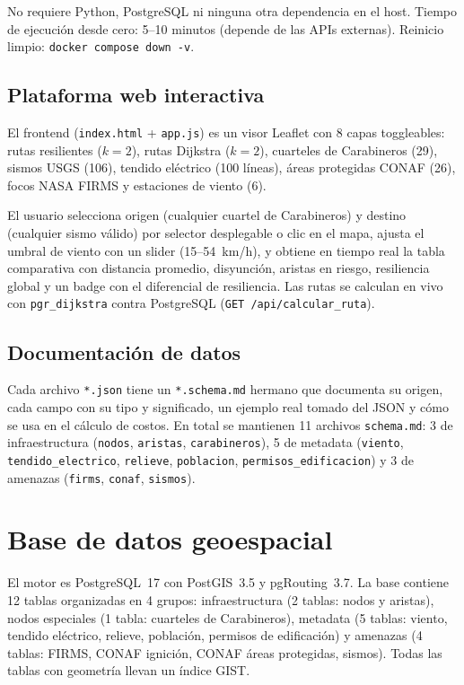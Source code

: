 \documentclass[conference]{IEEEtran}
\begin{document}
No requiere Python, PostgreSQL ni ninguna otra dependencia en el host. Tiempo de ejecución desde cero: 5--10 minutos (depende de las APIs externas). Reinicio limpio: \texttt{docker compose down -v}.

\subsection{Plataforma web interactiva}

El frontend (\texttt{index.html} + \texttt{app.js}) es un visor Leaflet con 8 capas toggleables: rutas resilientes ($k=2$), rutas Dijkstra ($k=2$), cuarteles de Carabineros (29), sismos USGS (106), tendido eléctrico (100 líneas), áreas protegidas CONAF (26), focos NASA FIRMS y estaciones de viento (6).

El usuario selecciona origen (cualquier cuartel de Carabineros) y destino (cualquier sismo válido) por selector desplegable o clic en el mapa, ajusta el umbral de viento con un slider (15--54~km/h), y obtiene en tiempo real la tabla comparativa con distancia promedio, disyunción, aristas en riesgo, resiliencia global y un badge con el diferencial de resiliencia. Las rutas se calculan en vivo con \texttt{pgr\_dijkstra} contra PostgreSQL (\texttt{GET /api/calcular\_ruta}).

\subsection{Documentación de datos}

Cada archivo \texttt{*.json} tiene un \texttt{*.schema.md} hermano que documenta su origen, cada campo con su tipo y significado, un ejemplo real tomado del JSON y cómo se usa en el cálculo de costos. En total se mantienen 11 archivos \texttt{schema.md}: 3 de infraestructura (\texttt{nodos}, \texttt{aristas}, \texttt{carabineros}), 5 de metadata (\texttt{viento}, \texttt{tendido\_electrico}, \texttt{relieve}, \texttt{poblacion}, \texttt{permisos\_edificacion}) y 3 de amenazas (\texttt{firms}, \texttt{conaf}, \texttt{sismos}).

\section{Base de datos geoespacial}
\label{sec:recursos}

El motor es PostgreSQL~17 con PostGIS~3.5 y pgRouting~3.7. La base contiene 12 tablas organizadas en 4 grupos: infraestructura (2 tablas: nodos y aristas), nodos especiales (1 tabla: cuarteles de Carabineros), metadata (5 tablas: viento, tendido eléctrico, relieve, población, permisos de edificación) y amenazas (4 tablas: FIRMS, CONAF ignición, CONAF áreas protegidas, sismos). Todas las tablas con geometría llevan un índice GIST.
\end{document}
